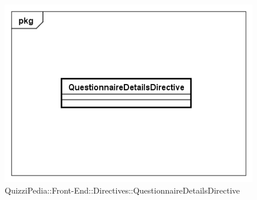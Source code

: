 \begin{figure}[ht]
	\centering
	\includegraphics[scale=0.5,keepaspectratio]{UML/Classi/Front-End/QuizziPedia_Front-end_Directives_QuestionnaireDetailsDirective.png}
	\caption{QuizziPedia::Front-End::Directives::QuestionnaireDetailsDirective}
\end{figure} \FloatBarrier

